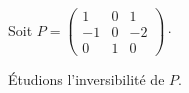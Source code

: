 \documentclass[a4paper,10pt]{report}
\begin{document}
\begin{Exemple} Soit $P = \begin{pmatrix}
        1&0&1\\-1&0&-2\\0&1&0
       \end{pmatrix} \cdot$
       
Étudions l'inversibilité de $P$. 

%

\end{Exemple}
\end{document}
